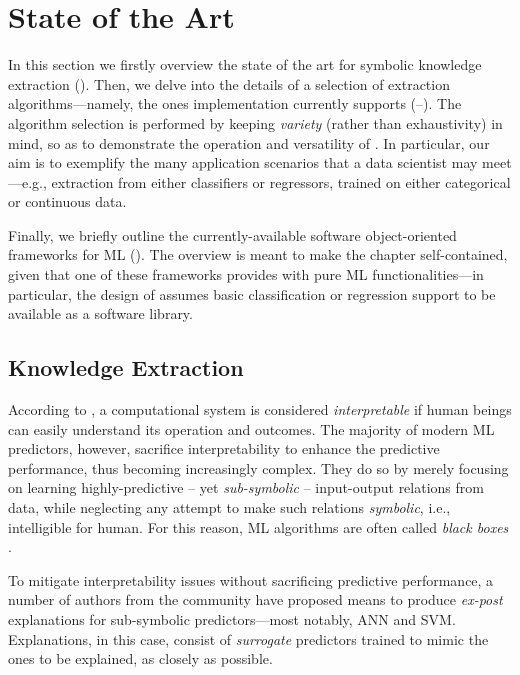 \documentclass[12pt,a4paper,openright,twoside]{book}
\begin{document}
\section{State of the Art}\label{sec:state}

In this section we firstly overview the state of the art for symbolic knowledge extraction ().
%
Then, we delve into the details of a selection of extraction algorithms---namely, the ones \psyke{} implementation currently supports (--).
%
The algorithm selection is performed by keeping \emph{variety} (rather than exhaustivity) in mind, so as to demonstrate the operation and versatility of \psyke{}.
%
In particular, our aim is to exemplify the many application scenarios that a data scientist may meet---e.g., extraction from either classifiers or regressors, trained on either categorical or continuous data.

Finally, we briefly outline the currently-available software object-oriented frameworks for ML  ().
%
The overview is meant to make the chapter self-contained, given that one of these frameworks provides \psyke{} with pure ML functionalities---in particular, the design of \psyke{} assumes basic classification or regression support to be available as a software library.

\subsection{Knowledge Extraction}\label{ssec:extraction}

According to \cite{agentbasedxai-aamas2020}, a computational system is considered \emph{interpretable} if human beings can easily understand its operation and outcomes.
%
The majority of modern ML predictors, however, sacrifice interpretability to enhance the predictive performance, thus becoming increasingly complex.
%
They do so by merely focusing on learning highly-predictive -- yet \emph{sub-symbolic} -- input-output relations from data, while neglecting any attempt to make such relations \emph{symbolic}, i.e., intelligible for human.
%
For this reason, ML algorithms are often called \emph{black boxes} \cite{Lipton18}.

To mitigate interpretability issues without sacrificing predictive performance, a number of authors from the \xai{} community have proposed means to produce \emph{ex-post} explanations for sub-symbolic predictors---most notably, ANN and SVM.
%
Explanations, in this case, consist of \emph{surrogate} predictors trained to mimic the ones to be explained, as closely as possible.
\end{document}
